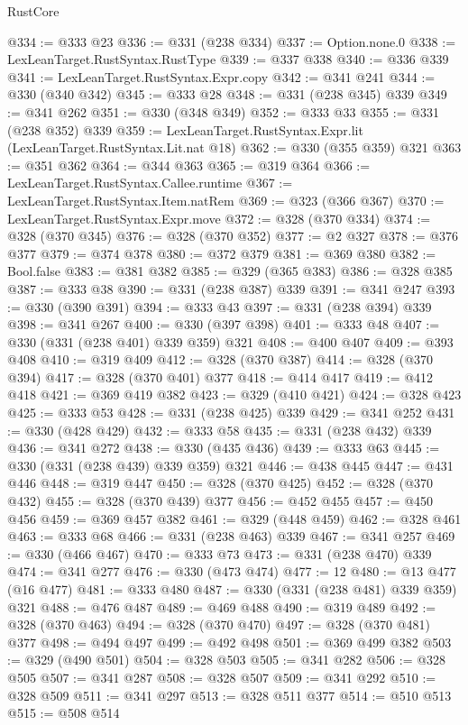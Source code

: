 \begin{lexlean}{RustCore}
\begin{coremodule}
@334 := @333 @23
@336 := @331 (@238 @334)
@337 := Option.none.{0}
@338 := LexLeanTarget.RustSyntax.RustType
@339 := @337 @338
@340 := @336 @339
@341 := LexLeanTarget.RustSyntax.Expr.copy
@342 := @341 @241
@344 := @330 (@340 @342)
@345 := @333 @28
@348 := @331 (@238 @345) @339
@349 := @341 @262
@351 := @330 (@348 @349)
@352 := @333 @33
@355 := @331 (@238 @352) @339
@359 := LexLeanTarget.RustSyntax.Expr.lit (LexLeanTarget.RustSyntax.Lit.nat @18)
@362 := @330 (@355 @359) @321
@363 := @351 @362
@364 := @344 @363
@365 := @319 @364
@366 := LexLeanTarget.RustSyntax.Callee.runtime
@367 := LexLeanTarget.RustSyntax.Item.natRem
@369 := @323 (@366 @367)
@370 := LexLeanTarget.RustSyntax.Expr.move
@372 := @328 (@370 @334)
@374 := @328 (@370 @345)
@376 := @328 (@370 @352)
@377 := @2 @327
@378 := @376 @377
@379 := @374 @378
@380 := @372 @379
@381 := @369 @380
@382 := Bool.false
@383 := @381 @382
@385 := @329 (@365 @383)
@386 := @328 @385
@387 := @333 @38
@390 := @331 (@238 @387) @339
@391 := @341 @247
@393 := @330 (@390 @391)
@394 := @333 @43
@397 := @331 (@238 @394) @339
@398 := @341 @267
@400 := @330 (@397 @398)
@401 := @333 @48
@407 := @330 (@331 (@238 @401) @339 @359) @321
@408 := @400 @407
@409 := @393 @408
@410 := @319 @409
@412 := @328 (@370 @387)
@414 := @328 (@370 @394)
@417 := @328 (@370 @401) @377
@418 := @414 @417
@419 := @412 @418
@421 := @369 @419 @382
@423 := @329 (@410 @421)
@424 := @328 @423
@425 := @333 @53
@428 := @331 (@238 @425) @339
@429 := @341 @252
@431 := @330 (@428 @429)
@432 := @333 @58
@435 := @331 (@238 @432) @339
@436 := @341 @272
@438 := @330 (@435 @436)
@439 := @333 @63
@445 := @330 (@331 (@238 @439) @339 @359) @321
@446 := @438 @445
@447 := @431 @446
@448 := @319 @447
@450 := @328 (@370 @425)
@452 := @328 (@370 @432)
@455 := @328 (@370 @439) @377
@456 := @452 @455
@457 := @450 @456
@459 := @369 @457 @382
@461 := @329 (@448 @459)
@462 := @328 @461
@463 := @333 @68
@466 := @331 (@238 @463) @339
@467 := @341 @257
@469 := @330 (@466 @467)
@470 := @333 @73
@473 := @331 (@238 @470) @339
@474 := @341 @277
@476 := @330 (@473 @474)
@477 := 12
@480 := @13 @477 (@16 @477)
@481 := @333 @480
@487 := @330 (@331 (@238 @481) @339 @359) @321
@488 := @476 @487
@489 := @469 @488
@490 := @319 @489
@492 := @328 (@370 @463)
@494 := @328 (@370 @470)
@497 := @328 (@370 @481) @377
@498 := @494 @497
@499 := @492 @498
@501 := @369 @499 @382
@503 := @329 (@490 @501)
@504 := @328 @503
@505 := @341 @282
@506 := @328 @505
@507 := @341 @287
@508 := @328 @507
@509 := @341 @292
@510 := @328 @509
@511 := @341 @297
@513 := @328 @511 @377
@514 := @510 @513
@515 := @508 @514

\end{coremodule}
\end{lexlean}
